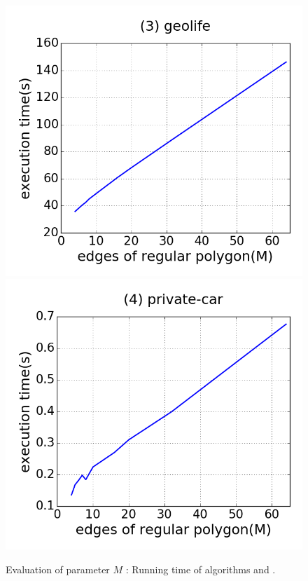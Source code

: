 \begin{figure}[tb!]
\includegraphics[scale = 0.24]{figures/Exp-M-time-geolife.png}
\includegraphics[scale = 0.24]{figures/Exp-M-time-private.png}
\vspace{-2ex}
\caption{\small Evaluation of parameter $M$ : Running time of algorithms \rpia and \cpia.}
\label{fig:m-poly-time}
\vspace{-1ex}
\end{figure}

